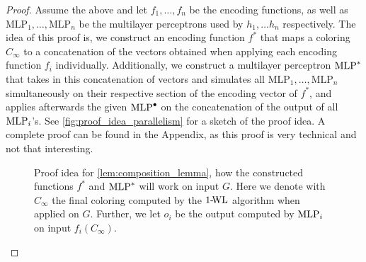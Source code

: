 \begin{proof}
    Assume the above and let $f_{1}, \ldots, f_{n}$ be the encoding functions, as well as $\text{MLP}_1, \ldots, \text{MLP}_n$ be the multilayer perceptrons used by $h_1, \dots h_n$ respectively. The idea of this proof is, we construct an encoding function $f^*$ that maps a coloring $C_\infty$ to a concatenation of the vectors obtained when applying each encoding function $f_i$ individually. Additionally, we construct a multilayer perceptron $\text{MLP}^*$ that takes in this concatenation of vectors and simulates all $\text{MLP}_1, \ldots, \text{MLP}_n$ simultaneously on their respective section of the encoding vector of $f^*$, and applies afterwards the given $\text{MLP}^\bullet$ on the concatenation of the output of all $\text{MLP}_i$'s.  See \autoref{fig:proof_idea_parallelism} for a sketch of the proof idea. A complete proof can be found in the Appendix, as this proof is very technical and not that interesting.

    \begin{figure}[H]
        \centering
        
        \caption{Proof idea for \cref{lem:composition_lemma}, how the constructed functions $f^*$ and $\text{MLP}^*$ will work on input $G$. Here we denote with $C_\infty$ the final coloring computed by the $\text{1-\!WL}$ algorithm when applied on $G$. Further, we let $o_i$ be the output computed by $\text{MLP}_i$ on input $f_i(C_\infty)$.}
        \label{fig:proof_idea_parallelism}
    \end{figure}
\end{proof}
    



